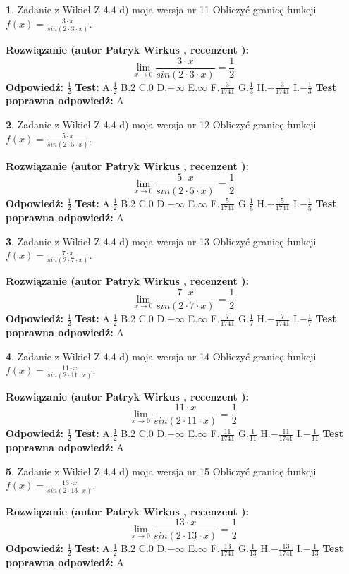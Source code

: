\documentclass[12pt, a4paper]{article}
\theoremstyle{definition} %
\newtheorem{zad}{}
\newcommand{\zadStart}[1]{\begin{zad}#1\newline}
\newcommand{\zadStop}{\end{zad}}
\newcommand{\rozwStart}[2]{\noindent \textbf{Rozwiązanie (autor #1 , recenzent #2): }\newline}
\newcommand{\rozwStop}{\newline}
\newcommand{\odpStart}{\noindent \textbf{Odpowiedź:}\newline}
\newcommand{\odpStop}{\newline}
\newcommand{\testStart}{\noindent \textbf{Test:}\newline}
\newcommand{\testStop}{\newline}
\newcommand{\kluczStart}{\noindent \textbf{Test poprawna odpowiedź:}\newline}
\newcommand{\kluczStop}{\newline}
\begin{document}
\zadStart{Zadanie z Wikieł Z 4.4 d) moja wersja nr 11}
Obliczyć granicę funkcji $f(x)=\frac{3\cdot x}{sin(2 \cdot3\cdot x)}$.
\zadStop
\rozwStart{Patryk Wirkus}{}
$$\lim\limits_{x\to 0}\frac{3\cdot x}{sin(2 \cdot3\cdot x)}=\frac{1}{2}$$
\rozwStop
\odpStart
$\frac{1}{2}$
\odpStop
\testStart
A.$\frac{1}{2}$
B.$2$
C.$0$
D.$-\infty$
E.$\infty$
F.$\frac{3}{1741}$
G.$\frac{1}{3}$
H.$-\frac{3}{1741}$
I.$-\frac{1}{3}$
\testStop
\kluczStart
A
\kluczStop



\zadStart{Zadanie z Wikieł Z 4.4 d) moja wersja nr 12}
Obliczyć granicę funkcji $f(x)=\frac{5\cdot x}{sin(2 \cdot5\cdot x)}$.
\zadStop
\rozwStart{Patryk Wirkus}{}
$$\lim\limits_{x\to 0}\frac{5\cdot x}{sin(2 \cdot5\cdot x)}=\frac{1}{2}$$
\rozwStop
\odpStart
$\frac{1}{2}$
\odpStop
\testStart
A.$\frac{1}{2}$
B.$2$
C.$0$
D.$-\infty$
E.$\infty$
F.$\frac{5}{1741}$
G.$\frac{1}{5}$
H.$-\frac{5}{1741}$
I.$-\frac{1}{5}$
\testStop
\kluczStart
A
\kluczStop



\zadStart{Zadanie z Wikieł Z 4.4 d) moja wersja nr 13}
Obliczyć granicę funkcji $f(x)=\frac{7\cdot x}{sin(2 \cdot7\cdot x)}$.
\zadStop
\rozwStart{Patryk Wirkus}{}
$$\lim\limits_{x\to 0}\frac{7\cdot x}{sin(2 \cdot7\cdot x)}=\frac{1}{2}$$
\rozwStop
\odpStart
$\frac{1}{2}$
\odpStop
\testStart
A.$\frac{1}{2}$
B.$2$
C.$0$
D.$-\infty$
E.$\infty$
F.$\frac{7}{1741}$
G.$\frac{1}{7}$
H.$-\frac{7}{1741}$
I.$-\frac{1}{7}$
\testStop
\kluczStart
A
\kluczStop



\zadStart{Zadanie z Wikieł Z 4.4 d) moja wersja nr 14}
Obliczyć granicę funkcji $f(x)=\frac{11\cdot x}{sin(2 \cdot11\cdot x)}$.
\zadStop
\rozwStart{Patryk Wirkus}{}
$$\lim\limits_{x\to 0}\frac{11\cdot x}{sin(2 \cdot11\cdot x)}=\frac{1}{2}$$
\rozwStop
\odpStart
$\frac{1}{2}$
\odpStop
\testStart
A.$\frac{1}{2}$
B.$2$
C.$0$
D.$-\infty$
E.$\infty$
F.$\frac{11}{1741}$
G.$\frac{1}{11}$
H.$-\frac{11}{1741}$
I.$-\frac{1}{11}$
\testStop
\kluczStart
A
\kluczStop



\zadStart{Zadanie z Wikieł Z 4.4 d) moja wersja nr 15}
Obliczyć granicę funkcji $f(x)=\frac{13\cdot x}{sin(2 \cdot13\cdot x)}$.
\zadStop
\rozwStart{Patryk Wirkus}{}
$$\lim\limits_{x\to 0}\frac{13\cdot x}{sin(2 \cdot13\cdot x)}=\frac{1}{2}$$
\rozwStop
\odpStart
$\frac{1}{2}$
\odpStop
\testStart
A.$\frac{1}{2}$
B.$2$
C.$0$
D.$-\infty$
E.$\infty$
F.$\frac{13}{1741}$
G.$\frac{1}{13}$
H.$-\frac{13}{1741}$
I.$-\frac{1}{13}$
\testStop
\kluczStart
A
\kluczStop
\end{document}
